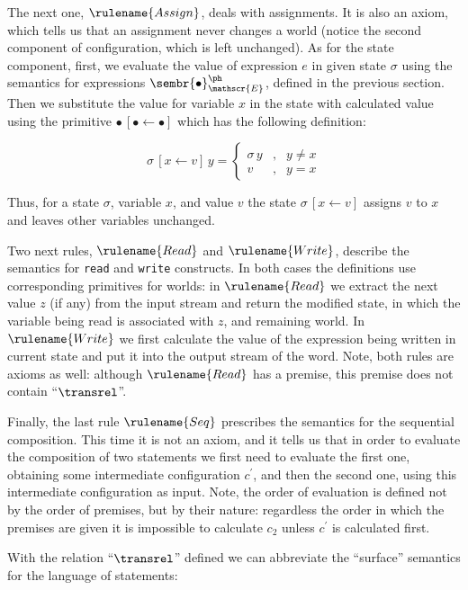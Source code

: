 The next one, $\rulename{Assign}$, deals with assignments. It is also an axiom, which tells us that an
assignment never changes a world (notice the second component of configuration, which is left unchanged).
As for the state component, first, we evaluate the value of expression $e$ in given state $\sigma$ using
the semantics for expressions $\sembr{\bullet}^\ph_\mathscr{E}$, defined in the previous section. Then we
substitute the value for variable $x$ in the state with calculated value using the primitive $\bullet\,[\bullet\gets \bullet]$
which has the following definition:

\[
\sigma\,[x\gets v]\,y=\left\{\begin{array}{rcl}
                                \sigma\,y & , & y \ne x\\
                                v & , & y = x
                             \end{array}
                   \right.
\]

Thus, for a state $\sigma$, variable $x$, and value $v$ the state $\sigma\,[x\gets v]$ assigns $v$ to $x$ and leaves other
variables unchanged.

Two next rules, $\rulename{Read}$ and $\rulename{Write}$, describe the semantics for \lstinline|read| and
\lstinline|write| constructs. In both cases the definitions use corresponding primitives for worlds: in $\rulename{Read}$
we extract the next value $z$ (if any) from the input stream and return the modified state, in which the variable being
read is associated with $z$, and remaining world. In $\rulename{Write}$ we first calculate the value of the expression
being written in current state and put it into the output stream of the word. Note, both rules are axioms as well:
although $\rulename{Read}$ has a premise, this premise does not contain ``$\transrel$''.

Finally, the last rule $\rulename{Seq}$ prescribes the semantics for the sequential composition. This time it is
not an axiom, and it tells us that in order to evaluate the composition of two statements we first need to
evaluate the first one, obtaining some intermediate configuration $c^\prime$, and then the second one, using
this intermediate configuration as input. Note, the order of evaluation is defined not by the order of
premises, but by their nature: regardless the order in which the premises are given it is impossible
to calculate $c_2$ unless $c^\prime$ is calculated first.

With the relation ``$\transrel$'' defined we can abbreviate the ``surface'' semantics for the language of statements:

